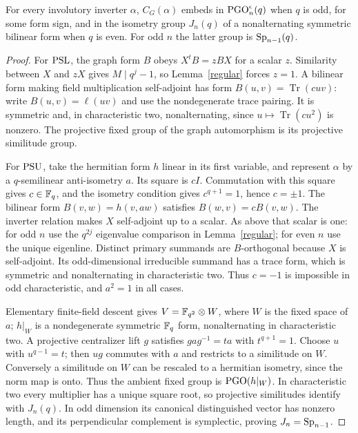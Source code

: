 \documentclass[10pt]{article}
\begin{document}
\begin{lemma}\label{fixed}
For every involutory inverter $\alpha$, $C_G(\alpha)$ embeds in
$\operatorname{PGO}_n^\epsilon(q)$ when $q$ is odd, for some form sign, and in the
isometry group $J_n(q)$ of a nonalternating symmetric bilinear form when
$q$ is even. For odd $n$ the latter group is $\operatorname{Sp}_{n-1}(q)$.
\end{lemma}
\begin{proof}
For $\operatorname{PSL}$, the graph form $B$ obeys $X^tB=zBX$ for a scalar $z$.
Similarity between $X$ and $zX$ gives $M\mid q^j-1$, so Lemma~\ref{regular}
forces $z=1$. A bilinear form making field multiplication self-adjoint has
form $B(u,v)=\operatorname{Tr}(cuv)$: write $B(u,v)=\ell(uv)$ and use the
nondegenerate trace pairing. It is symmetric and, in characteristic two,
nonalternating, since $u\mapsto\operatorname{Tr}(cu^2)$ is nonzero.
The projective fixed group of the graph automorphism is its projective
similitude group.

For $\operatorname{PSU}$, take the hermitian form $h$ linear in its first variable, and
represent $\alpha$ by a $q$-semilinear anti-isometry $a$. Its square is $cI$.
Commutation with this square gives $c\in\mathbb F_q$, and the isometry condition
gives $c^{q+1}=1$, hence $c=\pm1$. The bilinear form $B(v,w)=h(v,aw)$
satisfies $B(w,v)=cB(v,w)$. The inverter relation makes $X$ self-adjoint
up to a scalar. As above that scalar is one: for odd $n$ use the
$q^{2j}$ eigenvalue comparison in Lemma~\ref{regular}; for even $n$ use
the unique eigenline. Distinct primary summands are $B$-orthogonal because
$X$ is self-adjoint. Its odd-dimensional irreducible summand has a trace
form, which is symmetric and nonalternating in characteristic two.
Thus $c=-1$ is impossible in odd characteristic, and $a^2=1$ in all cases.

Elementary finite-field descent gives $V=\mathbb F_{q^2}\otimes W$, where $W$ is
the fixed space of $a$; $h|_W$ is a nondegenerate symmetric $\mathbb F_q$ form,
nonalternating in characteristic two. A projective centralizer lift $g$
satisfies $gag^{-1}=ta$ with $t^{q+1}=1$. Choose $u$ with $u^{q-1}=t$;
then $ug$ commutes with $a$ and restricts to a similitude on $W$.
Conversely a similitude on $W$ can be rescaled to a hermitian isometry,
since the norm map is onto. Thus the ambient fixed group is $\operatorname{PGO}(h|_W)$.
In characteristic two every multiplier has a unique square root, so
projective similitudes identify with $J_n(q)$. In odd dimension its
canonical distinguished vector has nonzero length, and its perpendicular
complement is symplectic, proving $J_n=\operatorname{Sp}_{n-1}$.
\end{proof}
\end{document}
